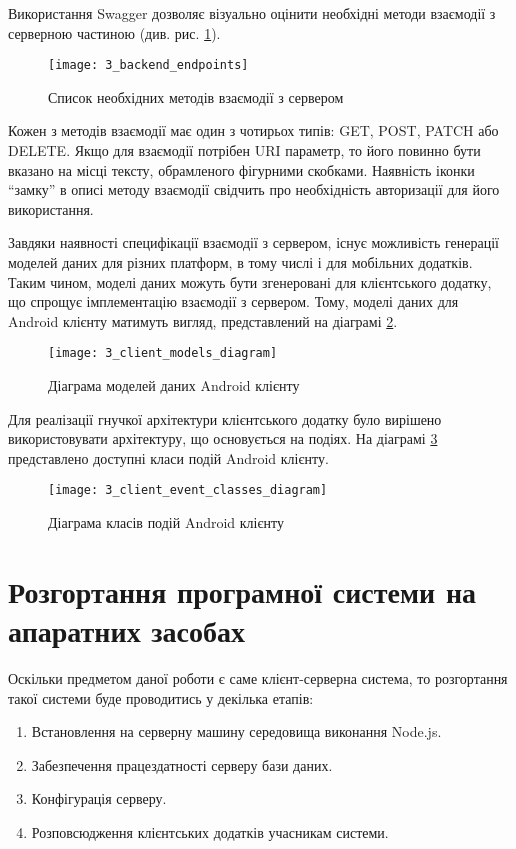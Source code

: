 \documentclass[../main.tex]{subfiles}
\begin{document}
Використання Swagger дозволяє візуально оцінити необхідні методи взаємодії з серверною частиною (див. рис. \ref{available_rest_endpoints}).

\begin{figure}[H]
	\centering
	\texttt{[image: 3\_backend\_endpoints]}
	\caption{Список необхідних методів взаємодії з сервером}
	\label{available_rest_endpoints}
\end{figure}

Кожен з методів взаємодії має один з чотирьох типів: GET, POST, PATCH або DELETE. Якщо для взаємодії потрібен URI параметр, то його повинно бути вказано на місці тексту, обрамленого фігурними скобками. Наявність іконки \enquote{замку} в описі методу взаємодії свідчить про необхідність авторизації для його використання.

Завдяки наявності специфікації взаємодії з сервером, існує можливість генерації моделей даних для різних платформ, в тому числі і для мобільних додатків. Таким чином, моделі даних можуть бути згенеровані для клієнтського додатку, що спрощує імплементацію взаємодії з сервером. Тому, моделі даних для Android клієнту матимуть вигляд, представлений на діаграмі \ref{client_models}.


\begin{figure}[H]
	\centering
	\texttt{[image: 3\_client\_models\_diagram]}
	\caption{Діаграма моделей даних Android клієнту}
	\label{client_models}
\end{figure}

Для реалізації гнучкої архітектури клієнтського додатку було вирішено використовувати архітектуру, що основується на подіях. На діаграмі \ref{client_events} представлено доступні класи подій Android клієнту.

\begin{figure}[H]
	\centering
	\texttt{[image: 3\_client\_event\_classes\_diagram]}
	\caption{Діаграма класів подій Android клієнту}
	\label{client_events}
\end{figure}

\section{Розгортання програмної системи на апаратних засобах}

Оскільки предметом даної роботи є саме клієнт-серверна система, то розгортання такої системи буде проводитись у декілька етапів:
\begin{enumerate}
	\item Встановлення на серверну машину середовища виконання Node.js.
	\item Забезпечення працездатності серверу бази даних.
	\item Конфігурація серверу.
	\item Розповсюдження клієнтських додатків учасникам системи.
\end{enumerate}
\end{document}
